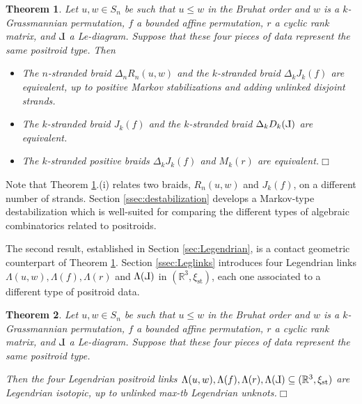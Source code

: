 \documentclass[10pt]{amsart}
\theoremstyle{plain}
\newtheorem{thm}{Theorem}[section]
\theoremstyle{definition}
\theoremstyle{remark}
\numberwithin{equation}{section}
\newcommand{\R}{\mathbb{R}}
\newcommand{\La}{\Lambda}
\newcommand{\sse}{\subseteq}
\newcommand{\st}{\text{st}}
\newcommand{\JS}[1]{{\color{cyan}{{\bf Jos\'e}: #1}}}
\newcommand{\MG}[1]{{\color{teal}{{\bf Misha}: #1}}}
\def\Le{\reflectbox{$\mathrm{L}$}}
\begin{document}
\begin{thm}\label{thm:main1}
Let $u,w\in S_n$ be such that $u\leq w$ in the Bruhat order and $w$ is a $k$-Grassmannian permutation, $f$ a bounded affine permutation, $r$ a cyclic rank matrix, and $\Le$ a Le-diagram. Suppose that these four pieces of data represent the same positroid type. Then

\begin{itemize}
	\item[(i)] The $n$-stranded braid $\Delta_nR_n(u,w)$ and the $k$-stranded braid $\Delta_kJ_k(f)$ are equivalent, up to positive Markov stabilizations and adding unlinked disjoint strands. \\%

    \item[(ii)] The $k$-stranded braid $J_k(f)$ and the $k$-stranded braid $\Delta_kD_k(\Le)$ are equivalent.\\
 
	\item[(iii)] The $k$-stranded positive braids $\Delta_kJ_k(f)$ and $M_k(r)$ are equivalent.\hfill$\Box$
\end{itemize}
\end{thm}

\noindent Note that Theorem \ref{thm:main1}.(i) relates two braids, $R_n(u,w)$ and $J_k(f)$, on %
a different number of strands. Section \ref{ssec:destabilization} develops a Markov-type destabilization  which is well-suited for  comparing the different types of algebraic combinatorics related to positroids.

The second result, established in Section \ref{sec:Legendrian}, is a contact geometric counterpart of Theorem \ref{thm:main1}. Section \ref{ssec:Leglinks} introduces four Legendrian links $\La(u,w),\La(f),\La(r)$ and $\La(\Le)$ in $(\R^3,\xi_\st)$, each one associated to a different type of positroid data. 

\begin{thm}\label{thm:main2}
Let $u,w\in S_n$ be such that $u\leq w$ in the Bruhat order and $w$ is a $k$-Grassmannian permutation, $f$ a bounded affine permutation, $r$ a cyclic rank matrix, and $\Le$ a Le-diagram. Suppose that these four pieces of data represent the same positroid type.

\noindent Then the four Legendrian positroid links $\La(u,w),\La(f),\La(r),\La(\Le)\sse(\R^3,\xi_\st)$ are Legendrian isotopic, up to unlinked max-tb Legendrian unknots.\hfill$\Box$
\end{thm}
\end{document}
